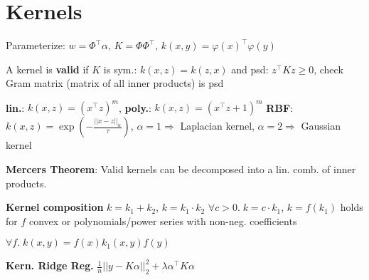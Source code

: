 \section*{Kernels}

Parameterize: $w = \Phi^\top \alpha$, $K = \Phi \Phi^\top$, $k(x,y) = \varphi(x)^\top \varphi(y)$

A kernel is \textbf{valid} if $K$ is sym.: $k(x,z) = k(z,x)$ and psd: $z^\top K z \geq 0$, check Gram matrix (matrix of all inner products) is psd

\textbf{lin.}: $k(x, z) = (x^\top z)^m$, \textbf{poly.}: $k(x, z) = (x^\top z + 1)^m$
\textbf{RBF}: $k(x, z) = \exp ( -\frac{||x - z||_\alpha}{\tau} )$, $\alpha = 1 \Rightarrow $ Laplacian kernel, $\alpha = 2 \Rightarrow $ Gaussian kernel

\textbf{Mercers Theorem}: Valid kernels can be decomposed into a lin. comb. of inner products.

\textbf{Kernel composition} $k = k_1 + k_2$, \quad $k = k_1 \cdot k_2$ \quad $\forall c > 0. \; k = c \cdot k_1$,
$k = f(k_1)$ holds for $f$ convex or polynomials/power series with non-neg. coefficients  

$\forall f. \; k(x,y) = f(x)k_1(x,y)f(y)$

\textbf{Kern. Ridge Reg.}
$\frac{1}{n} ||y - K\alpha ||_2^2 + \lambda \alpha^\top K \alpha$
